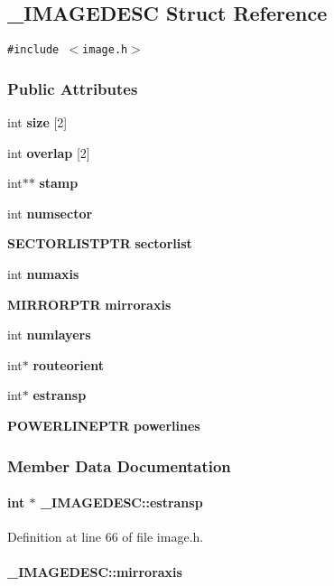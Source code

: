 \subsection{\_\-IMAGEDESC  Struct Reference}
\label{_IMAGEDESC}
{\tt \#include $<$image.h$>$}

\subsubsection*{Public Attributes}
\begin{CompactItemize}
\item 
int {\bf size} [2]
\item 
int {\bf overlap} [2]
\item 
int$\ast$$\ast$ {\bf stamp}
\item 
int {\bf numsector}
\item 
{\bf SECTORLISTPTR} {\bf sectorlist}
\item 
int {\bf numaxis}
\item 
{\bf MIRRORPTR} {\bf mirroraxis}
\item 
int {\bf numlayers}
\item 
int$\ast$ {\bf routeorient}
\item 
int$\ast$ {\bf estransp}
\item 
{\bf POWERLINEPTR} {\bf powerlines}
\end{CompactItemize}


\subsubsection{Member Data Documentation}
\label{_IMAGEDESC_m9}
\paragraph{\setlength{\rightskip}{0pt plus 5cm}int $\ast$ \_\-IMAGEDESC::estransp}\hfill



Definition at line 66 of file image.h.\label{_IMAGEDESC_m6}
\paragraph{ \_\-IMAGEDESC::mirroraxis}\hfill



